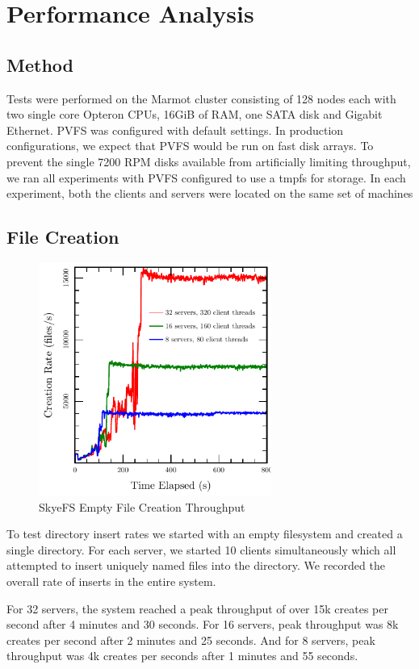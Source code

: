 \documentclass[onecolumn, 11pt, letterpaper]{article}
\begin{document}
\section{Performance Analysis}

\subsection{Method}
Tests were performed on the Marmot cluster consisting of 128 nodes each with two
single core Opteron CPUs, 16GiB of RAM, one SATA disk and Gigabit Ethernet.
PVFS was configured with default settings.  In production configurations, we
expect that PVFS would be run on fast disk arrays.  To prevent the single 7200
RPM disks available from artificially limiting throughput, we ran all
experiments with PVFS configured to use a tmpfs for storage.\cite{tmpfs}  In each
experiment, both the clients and servers were located on the same set of
machines

\subsection{File Creation}
\begin{figure}
\begin{center}
\includegraphics[width=3in]{graph-create}
\end{center}
\caption{SkyeFS Empty File Creation Throughput}
\end{figure}

To test directory insert rates we started with an empty filesystem and created
a single directory.  For each server, we started 10 clients simultaneously
which all attempted to insert uniquely named files into the directory.  We
recorded the overall rate of inserts in the entire system.

For 32 servers, the system reached a peak throughput of over 15k creates per second
after 4 minutes and 30 seconds.  For 16 servers, peak throughput was 8k
creates per second after 2 minutes and 25 seconds.  And for 8 servers, peak
throughput was 4k creates per seconds after 1 minutes and 55 seconds.
\end{document}
